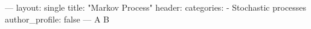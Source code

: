 ---
layout: single
title: "Markov Process"
header:
categories:
  - Stochastic processes
author_profile: false
---
A \cup B